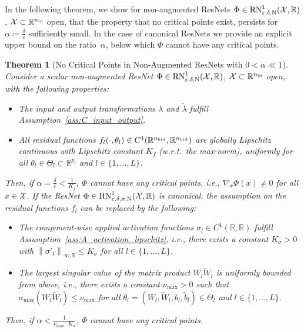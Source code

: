\documentclass[10pt]{article}
\newtheorem{theorem}{Theorem}[section]
\theoremstyle{definition}
\numberwithin{equation}{section}
\newcommand{\eps}{\varepsilon}
\newcommand\norm[1]{\left\lVert#1\right\rVert}
\newcommand{\R}{\mathbb{R}}
\newcommand*{\nhid}{n_\textup{hid}}
\newcommand*{\nin}{n_\textup{in}}
\begin{document}
In the following theorem, we show for non-augmented ResNets $\Phi \in \textup{RN}^1_{\eps,\delta,\textup{N}}(\mathcal{X},\R)$, $\mathcal{X}\subset \R^{\nin}$ open, that the property that no critical points exist, persists for $\alpha \coloneqq \frac{\delta}{\eps}$ sufficiently small. In the case of canonical ResNets we provide an explicit upper bound on the ratio~$\alpha$, below which $\Phi$ cannot have any critical points.

\begin{theorem}[No Critical Points in Non-Augmented ResNets with $0<\alpha \ll 1$] \label{th:resnet_criticalpoints_alphasmall}
	Consider a scalar non-augmented ResNet $\Phi \in \textup{RN}^1_{\eps,\delta,\textup{N}}(\mathcal{X},\R)$, $\mathcal{X}\subset \R^{\nin}$ open, with the following properties:
	\begin{itemize}
		\item The input and output transformations $\lambda$ and $\tilde{\lambda}$ fulfill Assumption~\ref{ass:C_input_output}.
		\item All residual functions $f_l(\cdot,\theta_l)\in C^1(\R^{\nhid},\R^{\nhid})$ are globally Lipschitz continuous with Lipschitz constant $K_f$ (w.r.t.~the max-norm), uniformly for all $\theta_l \in \Theta_l \subset \R^{p_l}$ and $l \in \{1,\ldots,L\}$.
	\end{itemize}
	Then, if $\alpha = \frac{\delta}{\eps} < \frac{1}{K_f}$,  $\Phi$ cannot have any critical points, i.e., $\nabla_x \Phi(x) \neq 0$ for all $x \in \mathcal{X}$. If the ResNet $\Phi \in \textup{RN}^1_{\eps,\delta,\sigma,\textup{N}}(\mathcal{X},\R)$ is canonical, the assumption on the residual functions $f_l$ can be replaced by the following:
	\begin{itemize}
		\item The component-wise applied activation functions $\sigma_l\in C^1(\R,\R)$ fulfill Assumption~\ref{ass:A_activation_lipschitz}, i.e., there exists a constant $K_\sigma > 0$ with $\norm{\sigma'_l}_{\infty,\R} \leq K_\sigma$ for all $l\in \{1,\ldots,L\}$.
		\item The largest singular value of the matrix product $W_l\widetilde{W}_{l}$ is uniformly bounded from above, i.e., there exists a constant $\nu_{\max}>0$ such that  $\sigma_{\max}(W_l\widetilde{W}_{l}) \leq \nu_{\max}$ for all $\theta_l = (W_l,\widetilde{W}_l,b_l,\tilde{b}_l)\in \Theta_l$ and $l \in \{1,\ldots,L\}$.
	\end{itemize}
	Then, if $\alpha < \frac{1}{\nu_{\max} \cdot K_{\sigma}}$,  $\Phi$ cannot have any critical points.
\end{theorem}
\end{document}
